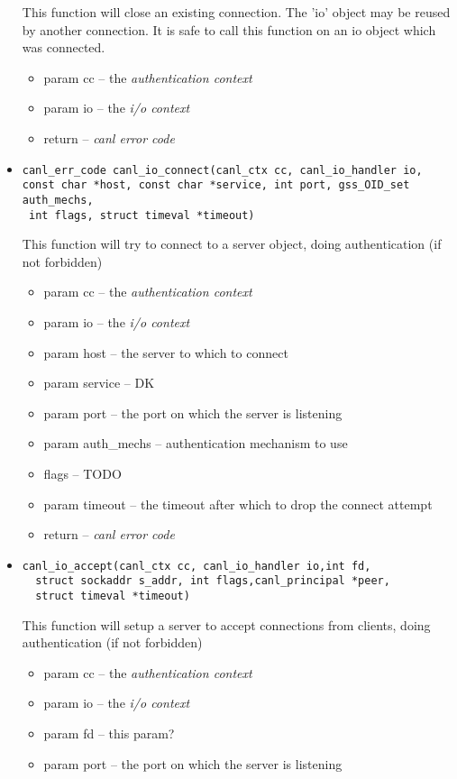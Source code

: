 \begin{itemize}
  This function will close an existing connection.  The 'io' object may 
  be reused by another connection. It is safe to call this 
  function on an io object which was connected.
  \begin{itemize}
    \item param cc -- the \textit{authentication context}
    \item param io -- the \textit{i/o context}
    \item return -- \textit{canl error code}
  \end{itemize}
  \item \begin{verbatim}canl_err_code canl_io_connect(canl_ctx cc, canl_io_handler io, 
const char *host, const char *service, int port, gss_OID_set auth_mechs,
 int flags, struct timeval *timeout)\end{verbatim}
  This function will try to connect to a server object, 
  doing authentication (if not forbidden)
  \begin{itemize}
    \item param cc -- the \textit{authentication context}
    \item param io -- the \textit{i/o context}
    \item param host -- the server to which to connect
    \item param service -- \TODO DK
    \item param port -- the port on which the server is listening
    \item param auth\_mechs -- authentication mechanism to use
    \item flags -- TODO
    \item param timeout -- the timeout after which to drop the connect attempt
    \item return -- \textit{canl error code}
  \end{itemize}
  \item \begin{verbatim}canl_io_accept(canl_ctx cc, canl_io_handler io,int fd,
  struct sockaddr s_addr, int flags,canl_principal *peer,
  struct timeval *timeout)\end{verbatim}
  This function will 
  setup a server to accept connections from clients, doing 
  authentication (if not forbidden)
  \begin{itemize}
    \item param cc -- the \textit{authentication context}
    \item param io -- the \textit{i/o context}
    \item param fd -- \TODO this param?
    \item param port -- the port on which the server is listening
  \end{itemize}

\end{itemize}

